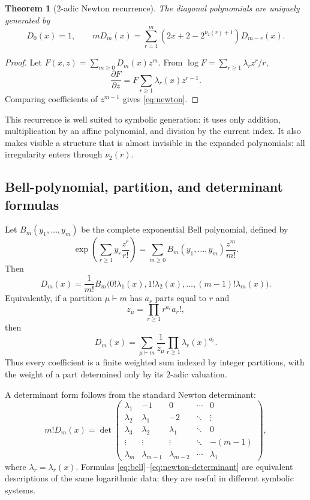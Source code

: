 \documentclass[11pt,oneside]{article}
\newtheorem{theorem}{Theorem}[section]
\theoremstyle{definition}
\theoremstyle{remark}
\newcommand{\Diag}{D}
\newcommand{\vtwo}{\nu_{2}}
\begin{document}
\begin{theorem}[$2$-adic Newton recurrence]
\label{thm:newton}
The diagonal polynomials are uniquely generated by
\begin{equation}
 \Diag_0(x)=1,
 \qquad
 m\Diag_m(x)=\sum_{r=1}^{m}
  \left(2x+2-2^{\vtwo(r)+1}\right)\Diag_{m-r}(x).
 \label{eq:newton}
\end{equation}
\end{theorem}

\begin{proof}
Let $F(x,z)=\sum_{m\ge0}\Diag_m(x)z^m$.  From
$\log F=\sum_{r\ge1}\lambda_rz^r/r$,
\[
 \frac{\partial F}{\partial z}
 =F\sum_{r\ge1}\lambda_r(x)z^{r-1}.
\]
Comparing coefficients of $z^{m-1}$ gives \eqref{eq:newton}.
\end{proof}

This recurrence is well suited to symbolic generation: it uses only addition,
multiplication by an affine polynomial, and division by the current index.
It also makes visible a structure that is almost invisible in the expanded
polynomials: all irregularity enters through $\vtwo(r)$.

\subsection{Bell-polynomial, partition, and determinant formulas}

Let $B_m(y_1,\ldots,y_m)$ be the complete exponential Bell polynomial,
defined by
\[
 \exp\!\left(\sum_{r\ge1}y_r\frac{z^r}{r!}\right)
 =\sum_{m\ge0}B_m(y_1,\ldots,y_m)\frac{z^m}{m!}.
\]
Then
\begin{equation}
 \boxed{\quad
 \Diag_m(x)=\frac{1}{m!}
 B_m\bigl(0!\lambda_1(x),1!\lambda_2(x),\ldots,(m-1)!\lambda_m(x)\bigr).
 \quad}
 \label{eq:bell}
\end{equation}
Equivalently, if a partition $\mu\vdash m$ has $a_r$ parts equal to $r$ and
\[
 z_\mu=\prod_{r\ge1}r^{a_r}a_r!,
\]
then
\begin{equation}
 \Diag_m(x)=\sum_{\mu\vdash m}
  \frac{1}{z_\mu}\prod_{r\ge1}\lambda_r(x)^{a_r}.
 \label{eq:partition-formula}
\end{equation}
Thus every coefficient is a finite weighted sum indexed by integer
partitions, with the weight of a part determined only by its $2$-adic
valuation.

A determinant form follows from the standard Newton determinant:
\begin{equation}
 m!\Diag_m(x)=
 \det\!\begin{pmatrix}
 \lambda_1 & -1 & 0 & \cdots & 0\\
 \lambda_2 & \lambda_1 & -2 & \ddots & \vdots\\
 \lambda_3 & \lambda_2 & \lambda_1 & \ddots & 0\\
 \vdots & \vdots & \vdots & \ddots & -(m-1)\\
 \lambda_m & \lambda_{m-1} & \lambda_{m-2} & \cdots & \lambda_1
 \end{pmatrix},
 \label{eq:newton-determinant}
\end{equation}
where $\lambda_r=\lambda_r(x)$.  Formulas
\eqref{eq:bell}--\eqref{eq:newton-determinant} are equivalent descriptions
of the same logarithmic data; they are useful in different symbolic systems.
\end{document}
